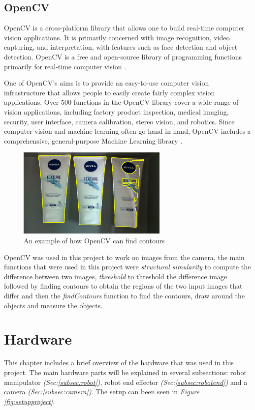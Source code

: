 \subsection{OpenCV}
OpenCV is a cross-platform library that allows one to build real-time computer vision applications. It is primarily concerned with image recognition, video capturing, and interpretation, with features such as face detection and object detection. OpenCV is a free and open-source library of programming functions primarily for real-time computer vision \cite{noauthor_opencv_nodate}.

One of OpenCV's aims is to provide an easy-to-use computer vision infrastructure that allows people to easily create fairly complex vision applications. Over 500 functions in the OpenCV library cover a wide range of vision applications, including factory product inspection, medical imaging, security, user interface, camera calibration, stereo vision, and robotics. Since computer vision and machine learning often go hand in hand, OpenCV includes a comprehensive, general-purpose Machine Learning library \cite{kaehler_what_2016}.

\begin{figure}[h]
    \centering
    \includegraphics[width=0.65\textwidth]{graphics/contour.PNG}
    \caption{An example of how OpenCV can find contours}
    \label{fig:opencvcontour}
\end{figure}

OpenCV was used in this project to work on images from the camera, the main functions that were used in this project were \textit{structural simularity} to compute the difference between two images,  \textit{threshold} to threshold the difference image followed by finding contours to obtain the regions of the two input images that differ and then the \textit{findContours} function to find the contours, draw around the objects and measure the objects.

\clearpage
\section{Hardware \label{sec:hardware}}
This chapter includes a brief overview of the hardware that was used in this project. The main hardware parts will be explained in several subsections: robot manipulator \textit{(Sec:\ref{subsec:robot})}, robot end effector \textit{(Sec:\ref{subsec:robotend})} and a camera \textit{(Sec:\ref{subsec:camera})}. The setup can been seen in \textit{Figure \ref{fig:setupproject}}.

